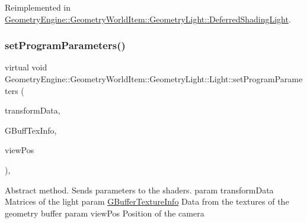 Reimplemented in \mbox{\hyperlink{class_geometry_engine_1_1_geometry_world_item_1_1_geometry_light_1_1_deferred_shading_light_a2071d92505a56dfb846b87c2aca9b94b}{Geometry\+Engine\+::\+Geometry\+World\+Item\+::\+Geometry\+Light\+::\+Deferred\+Shading\+Light}}.

\mbox{\label{class_geometry_engine_1_1_geometry_world_item_1_1_geometry_light_1_1_light_a366be5945389fe58df4bf5aa8c43138f}} 
\subsubsection{\texorpdfstring{setProgramParameters()}{setProgramParameters()}}
{\footnotesize\ttfamily virtual void Geometry\+Engine\+::\+Geometry\+World\+Item\+::\+Geometry\+Light\+::\+Light\+::set\+Program\+Parameters (\begin{DoxyParamCaption}\item[{const \mbox{\hyperlink{class_geometry_engine_1_1_lighting_transformation_data}{Lighting\+Transformation\+Data}} \&}]{transform\+Data,  }\item[{const \mbox{\hyperlink{class_geometry_engine_1_1_g_buffer_texture_info}{G\+Buffer\+Texture\+Info}} \&}]{G\+Buff\+Tex\+Info,  }\item[{const Q\+Vector3D \&}]{view\+Pos }\end{DoxyParamCaption})\hspace{0.3cm}{\ttfamily [protected]}, {}}

Abstract method. Sends parameters to the shaders. param transform\+Data Matrices of the light param \mbox{\hyperlink{class_geometry_engine_1_1_g_buffer_texture_info}{G\+Buffer\+Texture\+Info}} Data from the textures of the geometry buffer param view\+Pos Position of the camera 

